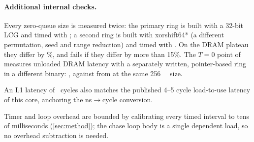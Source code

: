 \paragraph{Additional internal checks.} Every zero-queue size is measured twice: the primary ring is built
with a 32-bit LCG and timed with ; a second ring is built with xorshift64* (a
different permutation, seed and range reduction) and timed with . On the DRAM plateau they
differ by \%, and  fails if they differ by more than 15\%. The $T=0$
point of  measures unloaded DRAM latency with a separately written, pointer-based ring
in a different binary: , against  from
 at the same \qty{256}{\mebi\byte} size.

An L1 latency of ~cycles also matches the published 4--5 cycle load-to-use latency of
this core, anchoring the ns$\to$cycle conversion.

Timer and loop overhead are bounded by calibrating every timed interval to tens of milliseconds
(\cref{sec:method}); the chase loop body is a single dependent load, so no overhead subtraction is needed.
